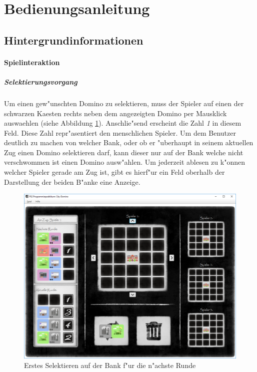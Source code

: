 \section{Bedienungsanleitung}
\subsection{Hintergrundinformationen}
\FloatBarrier

\paragraph{Spielinteraktion}
\subparagraph{Selektierungsvorgang}
Um einen gew"unschten Domino zu selektieren, muss der Spieler auf einen der schwarzen Kaesten rechts neben dem angezeigten Domino per Mausklick auswaehlen (siehe Abbildung \ref{fig:erstesSelektierenNaechsteBank}). Anschlie"send erscheint die Zahl \emph{1} in diesem Feld. Diese Zahl repr"asentiert den menschlichen Spieler. Um dem Benutzer deutlich zu machen von welcher Bank, oder ob er "uberhaupt in seinem aktuellen Zug einen Domino selektieren darf, kann dieser nur auf der Bank welche nicht verschwommen ist einen Domino ausw"ahlen. Um jederzeit ablesen zu k"onnen welcher Spieler gerade am Zug ist, gibt es hierf"ur ein Feld oberhalb der Darstellung der beiden B"anke eine Anzeige. 

\begin{figure}
	\centering
	\includegraphics{screenshots/screenshot_ErstesSelektierenAufNaechsterBank}
	\caption[Erstes Selektieren]{Erstes Selektieren auf der Bank f"ur die n"achste Runde}
	\label{fig:erstesSelektierenNaechsteBank}
\end{figure}

